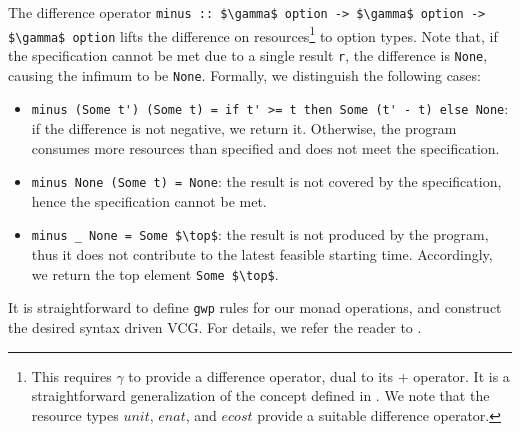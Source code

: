 \documentclass[acmsmall]{acmart}
\newcommand{\is}{\lstinline[language=isabelle]}
\begin{document}
%
%
%
The difference operator \is{minus :: $\gamma$ option -> $\gamma$ option -> $\gamma$ option} lifts the difference on resources\footnote{This requires $\gamma$ to provide a difference operator, dual to its + operator. It is a straightforward generalization of the concept defined in \cite{HaslbeckL19}.
We note that the resource types $unit$, $enat$, and $ecost$ provide a suitable difference operator.
} to option types.
Note that, if the specification cannot be met due to a single result \is$r$, the difference is \is$None$, causing the infimum to be \is$None$. 
Formally, we distinguish the following cases:
\begin{itemize}
    \item \is{minus (Some t') (Some t) = if t' >= t then Some (t' - t) else None}: if the difference is not negative, we return it. Otherwise, the program consumes more resources than specified and does not meet the specification. 

    \item \is{minus None (Some t) = None}: 
      the result is not covered by the specification, hence the specification cannot be met. %
  
    \item \is{minus _ None = Some $\top$}: the result is not produced by the program, thus it does not contribute to the latest feasible starting time. Accordingly, we return the top element \is{Some $\top$}.
    
\end{itemize}

It is straightforward to define \is{gwp} rules for our monad operations, and construct the desired syntax driven VCG. For details, we refer the reader to \cite{HaslbeckL19}.





\end{document}
